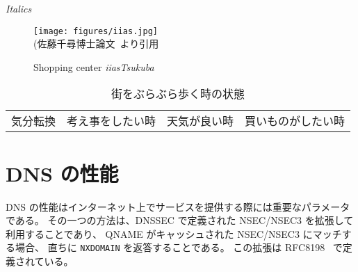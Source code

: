 {\itshape Italics}

\begin{figure}[htbp]
\centering
\texttt{[image: figures/iias.jpg]}\\
{\footnotesize(佐藤千尋博士論文~\cite{chihiro2014}より引用}
 \caption{Shopping center {\itshape iiasTsukuba}}
  \label{iias}
\end{figure}


\begin{table}[ht]
\caption{街をぶらぶら歩く時の状態}
\label{cluster_category}
\centering
\small
\begin{tabu} to \linewidth {|c|c|c|c|}
\hline
 &
 &
 &
\\
\hline
気分転換 & 考え事をしたい時 & 天気が良い時 & 買いものがしたい時\\
\hline
\end{tabu}
\end{table}

\section{DNS の性能}

DNS の性能はインターネット上でサービスを提供する際には重要なパラメータである。
その一つの方法は、DNSSEC で定義された NSEC/NSEC3 を拡張して利用することであり、
QNAME がキャッシュされた NSEC/NSEC3 にマッチする場合、
直ちに {\tt NXDOMAIN} を返答することである。
この拡張は RFC8198~\cite{rfc8198} で定義されている。

\putendnotes


